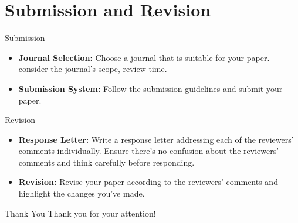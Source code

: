 \documentclass{beamer}
\begin{document}
\section{Submission and Revision}

\begin{frame}{Submission}
    \begin{itemize}
        \item \textbf{Journal Selection:} Choose a journal that is suitable for your paper. consider the journal's scope, review time.
        \item \textbf{Submission System:} Follow the submission guidelines and submit your paper.
    \end{itemize}
\end{frame}

\begin{frame}{Revision}
    \begin{itemize}
        \item \textbf{Response Letter:} Write a response letter addressing each of the reviewers' comments individually. Ensure there's no confusion about the reviewers' comments and think carefully before responding.
        \item \textbf{Revision:} Revise your paper according to the reviewers' comments and highlight the changes you've made.
    \end{itemize}
\end{frame}

\begin{frame}{Thank You}
    \centering
    \Large
    Thank you for your attention! \\
\end{frame}
\end{document}
